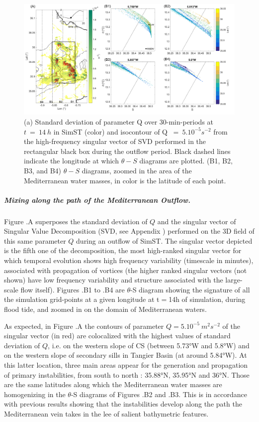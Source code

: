 \begin{figure}[!h]
 \includegraphics[width=\textwidth]{./GBR3D/TS_coupes_14H_VE2o.png}
 \caption [(A) Standard deviation of parameter Q and SVD field of Q. (B) $\theta-S$ diagrams.]{(a) Standard deviation of parameter Q over 30-min-periods at $t\ =\ 14\ h$ in SimST (color) and isocontour of Q $\ =\ 5.10^{-5} s^{-2}$ from the high-frequency singular vector of SVD performed in the rectangular black box during the outflow period. Black dashed lines indicate the longitude at which $\theta-S$ diagrams are plotted. (B1, B2, B3, and B4) $\theta-S$ diagrams, zoomed in the area of the Mediterranean water masses, in color is the latitude of each point.}
 \label{FigTSCS}
\end{figure}

\subparagraph{Mixing along the path of the Mediterranean Outflow.}
Figure .A superposes the standard deviation of $Q$ and the singular vector of Singular Value Decomposition (SVD, see Appendix ) performed on the 3D field of this same parameter $Q$ during an outflow of SimST. The singular vector depicted is the fifth one of the decomposition, the most high-ranked singular vector for which temporal evolution shows high frequency variability (timescale in minutes), associated with propagation of vortices (the higher ranked singular vectors (not shown) have low frequency variability and structure associated with the large-scale flow itself). Figures .B1 to .B4 are $\theta$-S diagram showing the signature of all the simulation grid-points at a given longitude at t$=$14h of simulation, during flood tide, and zoomed in on the domain of Mediterranean waters.

As expected, in Figure .A the contours of parameter $Q= 5.10^{-5}\ m^2s^{-2}$ of the singular vector (in red) are colocalized with the highest values of standard deviation of $Q$, i.e. on the western slope of CS (between 5.73°W and 5.8°W) and on the western slope of secondary sills in Tangier Basin (at around 5.84°W). At this latter location, three main areas appear for the generation and propagation of primary instabilities, from south to north : 35.88°N, 35.95°N and 36°N. Those are the same latitudes along which the Mediterranean water masses are homogenizing in the $\theta$-S diagrams of Figures .B2 and .B3. This is in accordance with previous results showing that the instabilities develop along the path the Mediterranean vein takes in the lee of salient bathymetric features. 

